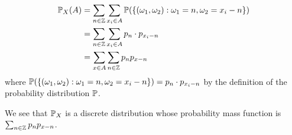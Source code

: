 \begin{align*}
    \P_{X}(A) &= \sum_{n \in \Z} \sum_{x_{i}  \in A} \P( \{ (\omega_1, \omega_2): \omega_1 = n,
    \omega_2 = x_{i} -n \} )\\
	      &= \sum_{n \in \Z} \sum_{x_{i} \in A} p_{n}\cdot p_{x_{i} -n} \\
	      &= \sum_{x \in A} \sum_{n \in \Z} p_{n} p_{x-n} 
\end{align*}
where $ \P( \{ (\omega_1, \omega_2): \omega_1 = n,\omega_2 = x_{i} -n \} ) = p_{n} \cdot p_{x_{i}-n } $
by the definition of the probability distribution $ \P$.

We see that $ \P_{X} $ is a discrete distribution whose probability mass function is $ \sum_{n\in \Z} p_{n} p_{x-n}
$.
